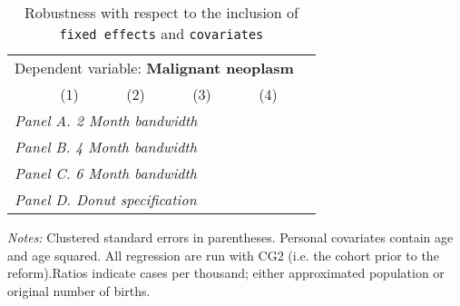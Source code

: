  \begin{table}[H] \begin{threeparttable} \centering \caption{Robustness with respect to the inclusion of \texttt{fixed effects} and \texttt{covariates}} {\def\sym#1{\ifmmode^{#1}\else\(^{#1}\)\fi} \begin{tabular}{l*{5}{c}} \toprule \multicolumn{5}{c}{Dependent variable: \textbf{Malignant neoplasm}} \\ \cmidrule(lr){2-5}
            &\multicolumn{1}{c}{(1)}&\multicolumn{1}{c}{(2)}&\multicolumn{1}{c}{(3)}&\multicolumn{1}{c}{(4)}\\
\midrule
 \multicolumn{5}{l}{\emph{Panel A. 2 Month bandwidth}} \\    \midrule\multicolumn{5}{l}{\emph{Panel B. 4 Month bandwidth}} \\    \midrule\multicolumn{5}{l}{\emph{Panel C. 6 Month bandwidth}} \\    \midrule\multicolumn{5}{l}{\emph{Panel D. Donut specification}} \\    \midrule  
\bottomrule \end{tabular} } \begin{tablenotes} \item \scriptsize \emph{Notes:} Clustered standard errors in parentheses. Personal covariates contain age and age squared. All regression are run with CG2 (i.e. the cohort prior to the reform).Ratios indicate cases per thousand; either approximated population or original number of births. \end{tablenotes} \end{threeparttable} \end{table} 
